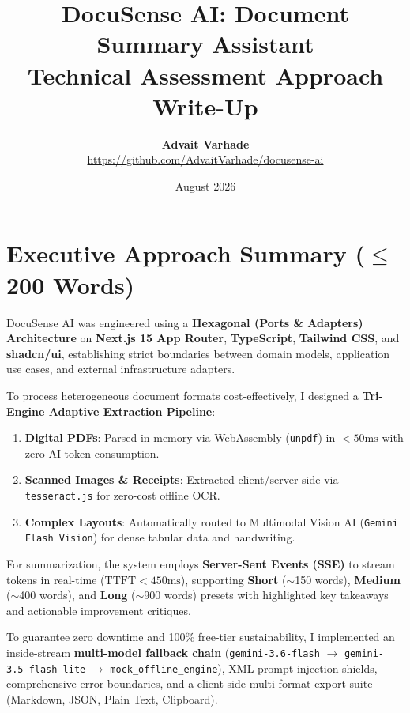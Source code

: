 \documentclass[11pt,a4paper]{article}
\title{\textbf{DocuSense AI: Document Summary Assistant}\\\large Technical Assessment Approach Write-Up}
\author{\textbf{Advait Varhade}\\\url{https://github.com/AdvaitVarhade/docusense-ai}}
\date{August 2026}
\begin{document}
\maketitle

\section*{Executive Approach Summary ($\le$ 200 Words)}

DocuSense AI was engineered using a \textbf{Hexagonal (Ports \& Adapters) Architecture} on \textbf{Next.js 15 App Router}, \textbf{TypeScript}, \textbf{Tailwind CSS}, and \textbf{shadcn/ui}, establishing strict boundaries between domain models, application use cases, and external infrastructure adapters.

To process heterogeneous document formats cost-effectively, I designed a \textbf{Tri-Engine Adaptive Extraction Pipeline}:
\begin{enumerate}
    \item \textbf{Digital PDFs}: Parsed in-memory via WebAssembly (\texttt{unpdf}) in $< 50\text{ms}$ with zero AI token consumption.
    \item \textbf{Scanned Images \& Receipts}: Extracted client/server-side via \texttt{tesseract.js} for zero-cost offline OCR.
    \item \textbf{Complex Layouts}: Automatically routed to Multimodal Vision AI (\texttt{Gemini Flash Vision}) for dense tabular data and handwriting.
\end{enumerate}

For summarization, the system employs \textbf{Server-Sent Events (SSE)} to stream tokens in real-time ($\text{TTFT} < 450\text{ms}$), supporting \textbf{Short} ($\sim$150 words), \textbf{Medium} ($\sim$400 words), and \textbf{Long} ($\sim$900 words) presets with highlighted key takeaways and actionable improvement critiques.

To guarantee zero downtime and 100\% free-tier sustainability, I implemented an inside-stream \textbf{multi-model fallback chain} (\texttt{gemini-3.6-flash} $\rightarrow$ \texttt{gemini-3.5-flash-lite} $\rightarrow$ \texttt{mock\_offline\_engine}), XML prompt-injection shields, comprehensive error boundaries, and a client-side multi-format export suite (Markdown, JSON, Plain Text, Clipboard).
\end{document}

